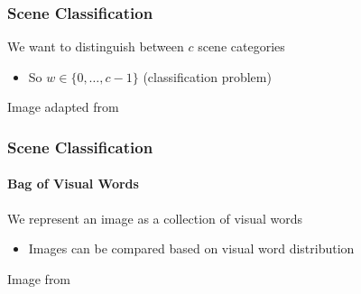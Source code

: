 \documentclass[xetex,professionalfont]{beamer}
\renewcommand\emph[1]{\textcolor{tuwcvl_inf_red}{#1}}
\begin{document}
\begin{frame}
\frametitle{Scene Classification}

We want to distinguish between $c$ scene categories
\begin{itemize}
    \item So $w\in\{0,\dots,c-1\}$ (classification problem)
\end{itemize}

\medskip
\begin{center}
    {\centering Image adapted from \cite{prince12}}
\end{center}

\end{frame}


\begin{frame}
\frametitle{Scene Classification}
\framesubtitle{Bag of Visual Words}

We represent an image as a collection of \emph{visual words} %
\begin{itemize}
    \item Images can be compared based on visual word distribution
\end{itemize}

\medskip
\begin{center}
    {\centering Image from \cite{prince12}}
\end{center}

\end{frame}
\end{document}
